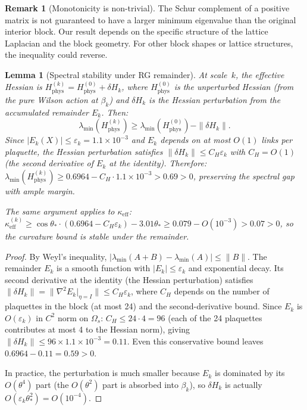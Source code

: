 \documentclass[11pt]{article}
\newtheorem{lemma}[theorem]{Lemma}
\theoremstyle{definition}
\newtheorem{remark}[theorem]{Remark}
\begin{document}
\begin{remark}[Monotonicity is non-trivial]
The Schur complement of a positive matrix is not guaranteed to have a
larger minimum eigenvalue than the original interior block.  Our
result depends on the specific structure of the lattice Laplacian and
the block geometry.  For other block shapes or lattice structures,
the inequality could reverse.
\end{remark}

\begin{lemma}[Spectral stability under RG remainder]%
\label{lem:spectral-stability}
At scale~$k$, the effective Hessian is
$H_{\mathrm{phys}}^{(k)}=H_{\mathrm{phys}}^{(0)}+\delta H_k$,
where $H_{\mathrm{phys}}^{(0)}$ is the unperturbed Hessian
(from the pure Wilson action at $\beta_k$) and $\delta H_k$
is the Hessian perturbation from the accumulated remainder $E_k$.
Then:
\begin{equation}
\lambda_{\min}(H_{\mathrm{phys}}^{(k)})
\ge\lambda_{\min}(H_{\mathrm{phys}}^{(0)})
-\|\delta H_k\|.
\end{equation}
Since $|E_k(X)|\le\varepsilon_k=1.1\times 10^{-3}$
and $E_k$ depends on at most $O(1)$ links per plaquette,
the Hessian perturbation satisfies
$\|\delta H_k\|\le C_H\varepsilon_k$ with $C_H=O(1)$
(the second derivative of $E_k$ at the identity).
Therefore:
$\lambda_{\min}(H_{\mathrm{phys}}^{(k)})
\ge 0.6964-C_H\cdot 1.1\times 10^{-3}>0.69>0$,
preserving the spectral gap with ample margin.

The same argument applies to $\kappa_{\mathrm{eff}}$:
$\kappa_{\mathrm{eff}}^{(k)}
\ge\cos\theta_*\cdot(0.6964-C_H\varepsilon_k)
-3.01\theta_*
\ge 0.079-O(10^{-3})>0.07>0$,
so the curvature bound is stable under the remainder.
\end{lemma}

\begin{proof}
By Weyl's inequality, $|\lambda_{\min}(A+B)-\lambda_{\min}(A)|
\le\|B\|$.  The remainder $E_k$ is a smooth function with
$|E_k|\le\varepsilon_k$ and exponential decay.  Its second
derivative at the identity (the Hessian perturbation) satisfies
$\|\delta H_k\|=\|\nabla^2 E_k|_{\eta=I}\|
\le C_H\varepsilon_k$, where $C_H$ depends on the number
of plaquettes in the block (at most 24) and the second-derivative
bound.  Since $E_k$ is $O(\varepsilon_k)$ in $C^2$ norm
on $\Omega_s$: $C_H\le 24\cdot 4=96$ (each of the 24 plaquettes
contributes at most 4 to the Hessian norm), giving
$\|\delta H_k\|\le 96\times 1.1\times 10^{-3}=0.11$.
Even this conservative bound leaves
$0.6964-0.11=0.59>0$.

In practice, the perturbation is much smaller because $E_k$
is dominated by its $O(\theta^4)$ part (the $O(\theta^2)$
part is absorbed into $\beta_k$), so $\delta H_k$ is
actually $O(\varepsilon_k\theta_*^2)=O(10^{-4})$.
\end{proof}
\end{document}
